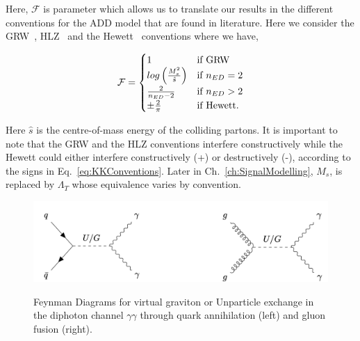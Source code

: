 Here, $\mathcal{F}$ is parameter which allows us to translate our results in the different conventions for the ADD model that are found in literature. Here we  consider the GRW~\cite{Giudice:1998ck}, HLZ~\cite{Han:1998sg} and the Hewett~\cite{Hewett:1998sn} conventions where we have, 

\begin{equation}
\mathcal{F}=
    \begin{cases}
        1 & \text{if } \textnormal{GRW} \\
        log\left(\frac{M^2_s}{\hat{s}}\right) & \text{if } n_{ED} = 2 \\
        \frac{2}{n_{ED} - 2} & \text{if } n_{ED} > 2 \\
        \pm \frac{2}{\pi} & \text{if } \textnormal{Hewett}.
    \end{cases}
    \label{eq:KKConventions}
\end{equation} 

Here $\hat{s}$ is the centre-of-mass energy of the colliding partons. It is important to note that the GRW and the HLZ conventions interfere constructively while the Hewett could either interfere constructively (+) or destructively (-), according to the signs in Eq.~\ref{eq:KKConventions}. Later in Ch.~\ref{ch:SignalModelling}, $M_s$, is replaced by $\Lambda_{T}$ whose equivalence varies by convention.




\begin{figure}[!htbpt]
    \centering
     \caption{Feynman Diagrams for virtual graviton or Unparticle exchange in the diphoton channel $\gamma\gamma$ through quark annihilation (left) and gluon fusion (right).}
    \includegraphics[scale=0.5]{fig/FeynmanDiagramUG.png}
    \label{fig:FeynmanDiagramUG}
\end{figure}

